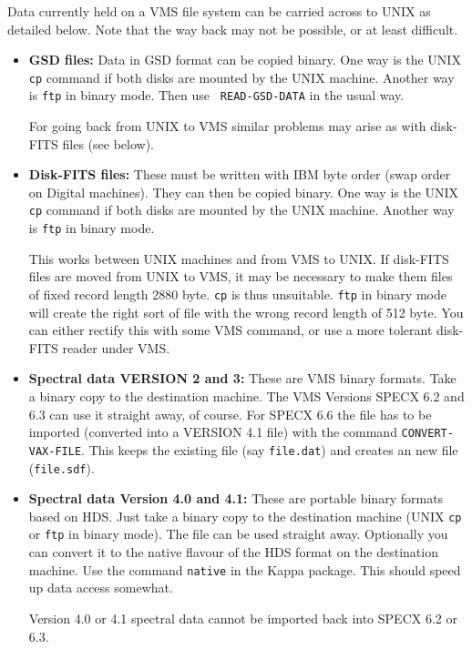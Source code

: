\documentclass[twoside,11pt]{article}
\newcommand{\xref}[3]{#1}
\renewcommand{\_}{\texttt{\symbol{95}}}
\begin{document}
Data currently held on a VMS file system can be carried across to UNIX
as detailed below. Note that the way back may not be possible, or at
least difficult.
\begin{itemize}
\item {\bf GSD files:}
    Data in \xref{GSD}{sun229}{} format can be copied binary. One way is the
    UNIX {\tt cp} command if both disks are mounted by the UNIX machine.
    Another way is {\tt ftp} in binary mode. Then use {\tt
    READ-GSD-DATA} in the usual way.

    For going back from UNIX to VMS similar problems may arise as with
    disk-FITS files (see below).

\item {\bf Disk-FITS files:}
    These must be written with IBM byte order (swap order
    on Digital machines). They can then be copied binary. One way is the
    UNIX {\tt cp} command if both disks are mounted by the UNIX machine.
    Another way is {\tt ftp} in binary mode.

    This works between UNIX machines and from VMS to UNIX. If disk-FITS
    files are moved from UNIX to VMS, it may be necessary to make them
    files of fixed record length 2880 byte. {\tt cp} is thus unsuitable.
    {\tt ftp} in binary mode will create the right sort of file with the
    wrong record length of 512 byte. You can either rectify this with
    some VMS command, or use a more tolerant disk-FITS reader under VMS.

\item {\bf Spectral data VERSION 2 and 3:}
    These are VMS binary formats. Take a
    binary copy to the destination machine. The VMS Versions SPECX 6.2
    and 6.3 can use it straight away, of course. For SPECX 6.6 the file
    has to be imported (converted into a VERSION 4.1 file) with the
    command {\tt CONVERT-VAX-FILE}. This keeps the existing file (say
    {\tt file.dat}) and creates an new file ({\tt file.sdf}).

\item {\bf Spectral data Version 4.0 and 4.1:}
    These are portable binary formats
    based on HDS. Just take a binary copy to the destination machine
    (UNIX {\tt cp} or {\tt ftp} in binary mode). The file can be used straight
    away. Optionally you can convert it to the native flavour of the HDS
    format on the destination machine. Use the command {\tt native} in the
    Kappa package. This should speed up data access somewhat.

    Version 4.0 or 4.1 spectral data cannot be imported back into SPECX
    6.2 or 6.3.


\end{itemize}
\end{document}
